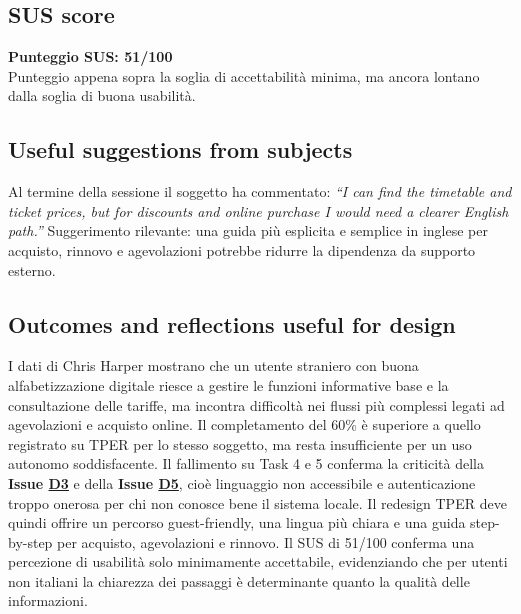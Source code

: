 \documentclass[11pt,a4paper]{article}
\begin{document}
\subsection*{SUS score}
\begin{tcolorbox}[colback=backgroundColor,colframe=borderColor,arc=2mm]
\textbf{Punteggio SUS: 51/100}\\[0.2cm]
\small Punteggio appena sopra la soglia di accettabilità minima, ma ancora lontano dalla soglia di buona usabilità.
\end{tcolorbox}

\subsection*{Useful suggestions from subjects}
\begin{tcolorbox}[colback=backgroundColor,colframe=borderColor,arc=2mm]
Al termine della sessione il soggetto ha commentato:
\textit{``I can find the timetable and ticket prices, but for discounts and online purchase I would need a clearer English path.''}
Suggerimento rilevante: una guida più esplicita e semplice in inglese per acquisto, rinnovo e agevolazioni potrebbe ridurre la dipendenza da supporto esterno.
\end{tcolorbox}
\subsection*{Outcomes and reflections useful for design}
\begin{tcolorbox}[colback=backgroundColor,colframe=borderColor,arc=2mm]
I dati di Chris Harper mostrano che un utente straniero con buona alfabetizzazione digitale riesce a gestire le funzioni informative base e la consultazione delle tariffe, ma incontra difficoltà nei flussi più complessi legati ad agevolazioni e acquisto online. Il completamento del 60\% è superiore a quello registrato su TPER per lo stesso soggetto, ma resta insufficiente per un uso autonomo soddisfacente. Il fallimento su Task 4 e 5 conferma la criticità della \textbf{Issue \hyperref[atac:D3]{D3}} e della \textbf{Issue \hyperref[atac:D5]{D5}}, cioè linguaggio non accessibile e autenticazione troppo onerosa per chi non conosce bene il sistema locale. Il redesign TPER deve quindi offrire un percorso guest-friendly, una lingua più chiara e una guida step-by-step per acquisto, agevolazioni e rinnovo. Il SUS di 51/100 conferma una percezione di usabilità solo minimamente accettabile, evidenziando che per utenti non italiani la chiarezza dei passaggi è determinante quanto la qualità delle informazioni.
\end{tcolorbox}
\end{document}
